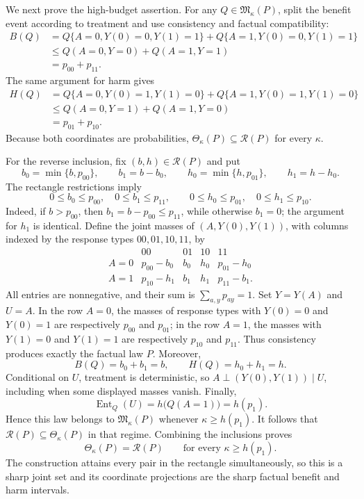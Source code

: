 We next prove the high-budget assertion. For any \(Q\in\mathfrak M_\kappa(P)\), split the benefit event according to treatment and use consistency and factual compatibility:
\[
\begin{aligned}
B(Q)
&=Q\{A=0,Y(0)=0,Y(1)=1\}
  +Q\{A=1,Y(0)=0,Y(1)=1\}\\
&\leq Q(A=0,Y=0)+Q(A=1,Y=1)\\
&=p_{00}+p_{11}.
\end{aligned}
\]
The same argument for harm gives
\[
\begin{aligned}
H(Q)
&=Q\{A=0,Y(0)=1,Y(1)=0\}
  +Q\{A=1,Y(0)=1,Y(1)=0\}\\
&\leq Q(A=0,Y=1)+Q(A=1,Y=0)\\
&=p_{01}+p_{10}.
\end{aligned}
\]
Because both coordinates are probabilities, \(\Theta_\kappa(P)\subseteq\mathcal R(P)\) for every \(\kappa\).

For the reverse inclusion, fix \((b,h)\in\mathcal R(P)\) and put
\[
b_0=\min\{b,p_{00}\},\qquad b_1=b-b_0,
\qquad
h_0=\min\{h,p_{01}\},\qquad h_1=h-h_0.
\]
The rectangle restrictions imply
\[
0\leq b_0\leq p_{00},\quad 0\leq b_1\leq p_{11},
\qquad
0\leq h_0\leq p_{01},\quad 0\leq h_1\leq p_{10}.
\]
Indeed, if \(b>p_{00}\), then \(b_1=b-p_{00}\leq p_{11}\), while otherwise \(b_1=0\); the argument for \(h_1\) is identical. Define the joint masses of \((A,Y(0),Y(1))\), with columns indexed by the response types \(00,01,10,11\), by
\[
\begin{array}{c|cccc}
 &00&01&10&11\\ \hline
A=0&p_{00}-b_0&b_0&h_0&p_{01}-h_0\\
A=1&p_{10}-h_1&b_1&h_1&p_{11}-b_1.
\end{array}
\]
All entries are nonnegative, and their sum is \(\sum_{a,y}p_{ay}=1\). Set \(Y=Y(A)\) and \(U=A\). In the row \(A=0\), the masses of response types with \(Y(0)=0\) and \(Y(0)=1\) are respectively \(p_{00}\) and \(p_{01}\); in the row \(A=1\), the masses with \(Y(1)=0\) and \(Y(1)=1\) are respectively \(p_{10}\) and \(p_{11}\). Thus consistency produces exactly the factual law \(P\). Moreover,
\[
B(Q)=b_0+b_1=b,
\qquad
H(Q)=h_0+h_1=h.
\]
Conditional on \(U\), treatment is deterministic, so \(A\perp(Y(0),Y(1))\mid U\), including when some displayed masses vanish. Finally,
\[
\operatorname{Ent}_Q(U)=h\bigl(Q(A=1)\bigr)=h(p_1).
\]
Hence this law belongs to \(\mathfrak M_\kappa(P)\) whenever \(\kappa\geq h(p_1)\). It follows that \(\mathcal R(P)\subseteq\Theta_\kappa(P)\) in that regime. Combining the inclusions proves
\[
\Theta_\kappa(P)=\mathcal R(P)\qquad\text{for every }\kappa\geq h(p_1).
\]
The construction attains every pair in the rectangle simultaneously, so this is a sharp joint set and its coordinate projections are the sharp factual benefit and harm intervals.